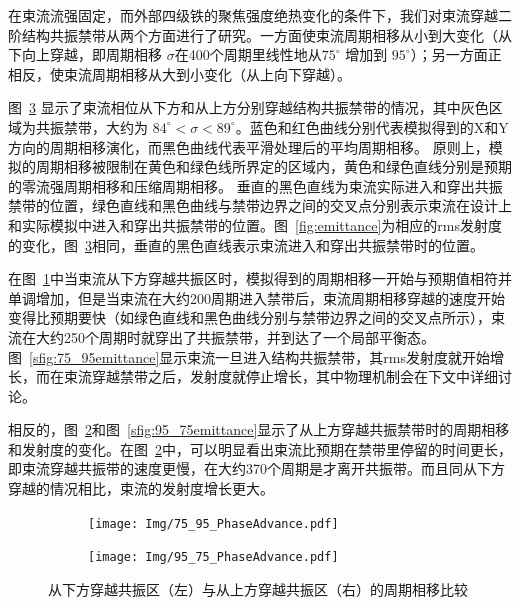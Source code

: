 在束流流强固定，而外部四级铁的聚焦强度绝热变化的条件下，我们对束流穿越二阶结构共振禁带从两个方面进行了研究。一方面使束流周期相移从小到大变化（从下向上穿越，即周期相移 $\sigma$在400个周期里线性地从$75^{\circ}$ 增加到 $95^{\circ}$）；另一方面正相反，使束流周期相移从大到小变化（从上向下穿越）。

图~\ref{fig:phase_advance} 显示了束流相位从下方和从上方分别穿越结构共振禁带的情况，其中灰色区域为共振禁带，大约为 $84^ {\circ}<\sigma<89^{\circ}$。蓝色和红色曲线分别代表模拟得到的X和Y方向的周期相移演化，而黑色曲线代表平滑处理后的平均周期相移。
原则上，模拟的周期相移被限制在黄色和绿色线所界定的区域内，黄色和绿色直线分别是预期的零流强周期相移和压缩周期相移。 垂直的黑色直线为束流实际进入和穿出共振禁带的位置，绿色直线和黑色曲线与禁带边界之间的交叉点分别表示束流在设计上和实际模拟中进入和穿出共振禁带的位置。图~\ref{fig:emittance}为相应的rms发射度的变化，图~\ref{fig:phase_advance}相同，垂直的黑色直线表示束流进入和穿出共振禁带时的位置。

在图~\ref{sfig:75_95phase}中当束流从下方穿越共振区时，模拟得到的周期相移一开始与预期值相符并单调增加，但是当束流在大约200周期进入禁带后，束流周期相移穿越的速度开始变得比预期要快（如绿色直线和黑色曲线分别与禁带边界之间的交叉点所示），束流在大约250个周期时就穿出了共振禁带，并到达了一个局部平衡态。
图~\ref{sfig:75_95emittance}显示束流一旦进入结构共振禁带，其rms发射度就开始增长，而在束流穿越禁带之后，发射度就停止增长，其中物理机制会在下文中详细讨论。

相反的，图~\ref{sfig:95_75phase}和图~\ref{sfig:95_75emittance}显示了从上方穿越共振禁带时的周期相移和发射度的变化。在图~\ref{sfig:95_75phase}中，可以明显看出束流比预期在禁带里停留的时间更长，即束流穿越共振带的速度更慢，在大约370个周期是才离开共振带。而且同从下方穿越的情况相比，束流的发射度增长更大。

\begin{figure}[thbp]
    \centering
    \begin{subfigure}[b]{0.48\textwidth}
        \centering
        \texttt{[image: Img/75\_95\_PhaseAdvance.pdf]}
        \caption{}
        \label{sfig:75_95phase}
    \end{subfigure}
    \begin{subfigure}[b]{0.48\textwidth}
        \centering
        \texttt{[image: Img/95\_75\_PhaseAdvance.pdf]}
        \caption{}
        \label{sfig:95_75phase}
    \end{subfigure}
    \caption{从下方穿越共振区（左）与从上方穿越共振区（右）的周期相移比较}
    \label{fig:phase_advance}
\end{figure}

